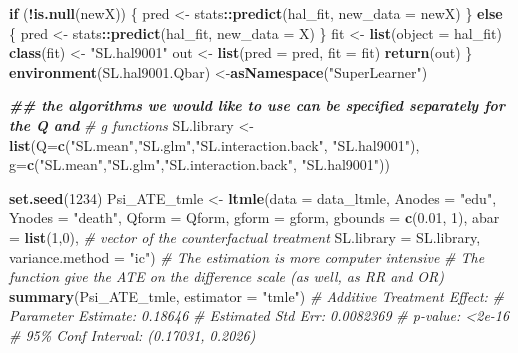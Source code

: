 \documentclass[
]{book}
\newenvironment{Shaded}{\begin{snugshade}}{\end{snugshade}}
\newcommand{\AttributeTok}[1]{\textcolor[rgb]{0.13,0.29,0.53}{#1}}
\newcommand{\CommentTok}[1]{\textcolor[rgb]{0.56,0.35,0.01}{\textit{#1}}}
\newcommand{\ControlFlowTok}[1]{\textcolor[rgb]{0.13,0.29,0.53}{\textbf{#1}}}
\newcommand{\DecValTok}[1]{\textcolor[rgb]{0.00,0.00,0.81}{#1}}
\newcommand{\DocumentationTok}[1]{\textcolor[rgb]{0.56,0.35,0.01}{\textbf{\textit{#1}}}}
\newcommand{\FloatTok}[1]{\textcolor[rgb]{0.00,0.00,0.81}{#1}}
\newcommand{\FunctionTok}[1]{\textcolor[rgb]{0.13,0.29,0.53}{\textbf{#1}}}
\newcommand{\NormalTok}[1]{#1}
\newcommand{\OtherTok}[1]{\textcolor[rgb]{0.56,0.35,0.01}{#1}}
\newcommand{\SpecialCharTok}[1]{\textcolor[rgb]{0.81,0.36,0.00}{\textbf{#1}}}
\newcommand{\StringTok}[1]{\textcolor[rgb]{0.31,0.60,0.02}{#1}}
\begin{document}
\begin{Shaded}
\begin{Highlighting}[]
  \ControlFlowTok{if}\NormalTok{ (}\SpecialCharTok{!}\FunctionTok{is.null}\NormalTok{(newX)) \{}
\NormalTok{    pred }\OtherTok{\textless{}{-}}\NormalTok{ stats}\SpecialCharTok{::}\FunctionTok{predict}\NormalTok{(hal\_fit, }\AttributeTok{new\_data =}\NormalTok{ newX)}
\NormalTok{  \}}
  \ControlFlowTok{else}\NormalTok{ \{}
\NormalTok{    pred }\OtherTok{\textless{}{-}}\NormalTok{ stats}\SpecialCharTok{::}\FunctionTok{predict}\NormalTok{(hal\_fit, }\AttributeTok{new\_data =}\NormalTok{ X)}
\NormalTok{  \}}
\NormalTok{  fit }\OtherTok{\textless{}{-}} \FunctionTok{list}\NormalTok{(}\AttributeTok{object =}\NormalTok{ hal\_fit)}
  \FunctionTok{class}\NormalTok{(fit) }\OtherTok{\textless{}{-}} \StringTok{"SL.hal9001"}
\NormalTok{  out }\OtherTok{\textless{}{-}} \FunctionTok{list}\NormalTok{(}\AttributeTok{pred =}\NormalTok{ pred, }\AttributeTok{fit =}\NormalTok{ fit)}
  \FunctionTok{return}\NormalTok{(out)}
\NormalTok{\}}
\FunctionTok{environment}\NormalTok{(SL.hal9001.Qbar) }\OtherTok{\textless{}{-}}\FunctionTok{asNamespace}\NormalTok{(}\StringTok{"SuperLearner"}\NormalTok{)}

\DocumentationTok{\#\# the algorithms we would like to use can be specified separately for the Q and }
\CommentTok{\# g functions}
\NormalTok{SL.library }\OtherTok{\textless{}{-}} \FunctionTok{list}\NormalTok{(}\AttributeTok{Q=}\FunctionTok{c}\NormalTok{(}\StringTok{"SL.mean"}\NormalTok{,}\StringTok{"SL.glm"}\NormalTok{,}\StringTok{"SL.interaction.back"}\NormalTok{, }\StringTok{"SL.hal9001"}\NormalTok{),}
                   \AttributeTok{g=}\FunctionTok{c}\NormalTok{(}\StringTok{"SL.mean"}\NormalTok{,}\StringTok{"SL.glm"}\NormalTok{,}\StringTok{"SL.interaction.back"}\NormalTok{, }\StringTok{"SL.hal9001"}\NormalTok{))}

\FunctionTok{set.seed}\NormalTok{(}\DecValTok{1234}\NormalTok{)}
\NormalTok{Psi\_ATE\_tmle }\OtherTok{\textless{}{-}} \FunctionTok{ltmle}\NormalTok{(}\AttributeTok{data =}\NormalTok{ data\_ltmle,}
                      \AttributeTok{Anodes =} \StringTok{"edu"}\NormalTok{,}
                      \AttributeTok{Ynodes =} \StringTok{"death"}\NormalTok{,}
                      \AttributeTok{Qform =}\NormalTok{ Qform,}
                      \AttributeTok{gform =}\NormalTok{ gform,}
                      \AttributeTok{gbounds =} \FunctionTok{c}\NormalTok{(}\FloatTok{0.01}\NormalTok{, }\DecValTok{1}\NormalTok{),}
                      \AttributeTok{abar =} \FunctionTok{list}\NormalTok{(}\DecValTok{1}\NormalTok{,}\DecValTok{0}\NormalTok{), }\CommentTok{\# vector of the counterfactual treatment}
                      \AttributeTok{SL.library =}\NormalTok{ SL.library,}
                      \AttributeTok{variance.method =} \StringTok{"ic"}\NormalTok{)}
\CommentTok{\# The estimation is more computer intensive}
\CommentTok{\# The function give the ATE on the difference scale (as well, as RR and OR)}
\FunctionTok{summary}\NormalTok{(Psi\_ATE\_tmle, }\AttributeTok{estimator =} \StringTok{"tmle"}\NormalTok{)}
\CommentTok{\# Additive Treatment Effect:}
\CommentTok{\#    Parameter Estimate:  0.18646 }
\CommentTok{\#     Estimated Std Err:  0.0082369 }
\CommentTok{\#               p{-}value:  \textless{}2e{-}16 }
\CommentTok{\#     95\% Conf Interval: (0.17031, 0.2026) }
    

\end{Highlighting}
\end{Shaded}
\end{document}
